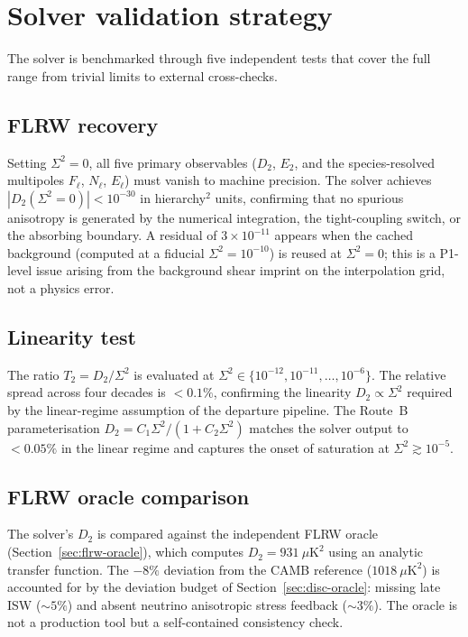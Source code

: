 \section{Solver validation strategy}
\label{sec:solver-validation}

The solver is benchmarked through five independent tests that
cover the full range from trivial limits to external
cross-checks.


\subsection{FLRW recovery}
\label{sec:flrw-recovery}

Setting $\Sigma^2 = 0$, all five primary observables ($D_2$,
$E_2$, and the species-resolved multipoles $F_\ell$, $N_\ell$,
$E_\ell$) must vanish to machine precision.  The solver achieves
$|D_2(\Sigma^2 = 0)| < 10^{-30}$ in hierarchy$^2$ units,
confirming that no spurious anisotropy is generated by the
numerical integration, the tight-coupling switch, or the
absorbing boundary.  A residual of $3 \times 10^{-11}$ appears
when the cached background (computed at a fiducial
$\Sigma^2 = 10^{-10}$) is reused at $\Sigma^2 = 0$; this is a
P1-level issue arising from the background shear imprint on the
interpolation grid, not a physics error.


\subsection{Linearity test}
\label{sec:solver-linearity}

The ratio $T_2 = D_2/\Sigma^2$ is evaluated at $\Sigma^2 \in
\{10^{-12}, 10^{-11}, \ldots, 10^{-6}\}$.  The relative spread
across four decades is $< 0.1\%$, confirming the linearity
$D_2 \propto \Sigma^2$ required by the linear-regime assumption
of the departure pipeline.  The Route~B parameterisation
$D_2 = C_1 \Sigma^2/(1 + C_2 \Sigma^2)$ matches the solver
output to $< 0.05\%$ in the linear regime and captures the
onset of saturation at $\Sigma^2 \gtrsim 10^{-5}$.


\subsection{FLRW oracle comparison}
\label{sec:oracle-comparison}
\label{sec:flrw-oracle}

The solver's $D_2$ is compared against the independent FLRW
oracle (Section~\ref{sec:flrw-oracle}), which computes
$D_2 = 931~\mu\mathrm{K}^2$ using an analytic transfer
function.  The $-8\%$ deviation from the CAMB reference
($1018~\mu\mathrm{K}^2$) is accounted for by the deviation
budget of Section~\ref{sec:disc-oracle}: missing late ISW
($\sim\!5\%$) and absent neutrino anisotropic stress feedback
($\sim\!3\%$).  The oracle is not a production tool but a
self-contained consistency check.


